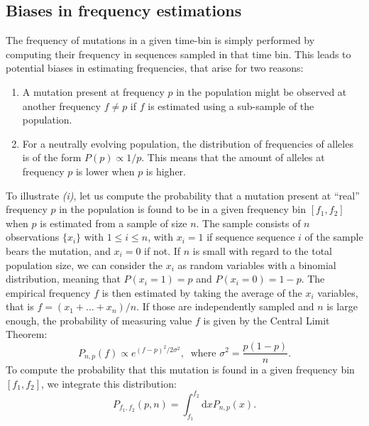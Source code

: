 \documentclass[reprint,amsmath,amssymb,superscriptaddress,showpacs,pre]{revtex4-1}
\begin{document}
\subsection{Biases in frequency estimations} %
\label{sub:biases_in_frequency_estimations}

	The frequency of mutations in a given time-bin is simply performed by computing their frequency in sequences sampled in that time bin. 
	This leads to potential biases in estimating frequencies, that arise for two reasons:
	\begin{enumerate}[label=(\roman*)]
		\item A mutation present at frequency $p$ in the population might be observed at another frequency $f\neq p$ if $f$ is estimated using a sub-sample of the population. 
		\item For a neutrally evolving population, the distribution of frequencies of alleles is of the form $P(p)\propto 1/p$. This means that the amount of alleles at frequency $p$ is lower when $p$ is higher. 
	\end{enumerate}
	To illustrate \emph{(i)}, let us compute the probability that a mutation present at ``real'' frequency $p$ in the population is found to be in a given frequency bin $[f_1,f_2]$ when $p$ is estimated from a sample of size $n$. 
	The sample consists of $n$ observations $\{x_i\}$ with $1\leq i\leq n$, with $x_i=1$ if sequence sequence $i$ of the sample bears the mutation, and $x_i=0$ if not. 
	If $n$ is small with regard to the total population size, we can consider the $x_i$ as random variables with a binomial distribution, meaning that $P(x_i=1)=p$ and $P(x_i=0) = 1-p$.  
	The empirical frequency $f$ is then estimated by taking the average of the $x_i$ variables, that is $f = (x_1 + \ldots + x_n)/n$. 
	If those are independently sampled and $n$ is large enough, the probability of measuring value $f$ is given by the Central Limit Theorem:
	\begin{equation}
		P_{n,p}(f) \propto e^{(f - p)^2 / 2\sigma^2},\;\; \text{where } \sigma^2 = \frac{p(1-p)}{n}.
		\label{eq:ctl}
	\end{equation}
	To compute the probability that this mutation is found in a given frequency bin $[f_1,f_2]$, we integrate this distribution: 
	\begin{equation}
		P_{f_1,f_2}(p,n) = \int_{f_1}^{f_2}\text{d}x P_{n,p}(x). %
		\label{eq:pinterval}
	\end{equation}
\end{document}
